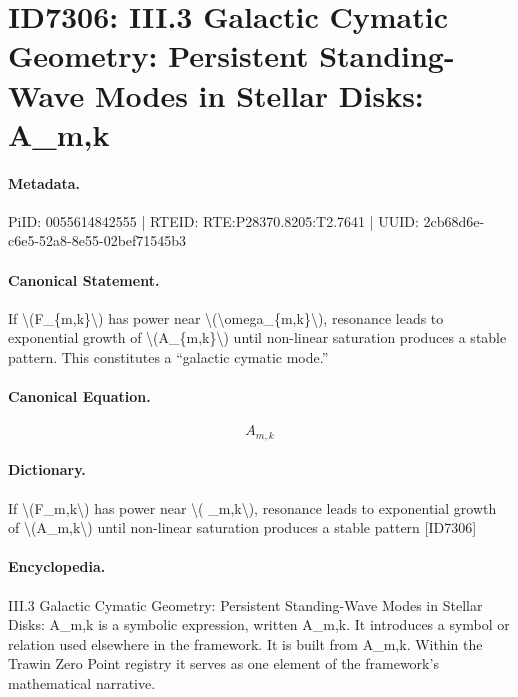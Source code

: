 \section*{ID7306: III.3 Galactic Cymatic Geometry: Persistent Standing-Wave Modes in Stellar Disks: A\_m,k}
\paragraph{Metadata.}
PiID: 0055614842555 | RTEID: RTE:P28370.8205:T2.7641 | UUID: 2cb68d6e-c6e5-52a8-8e55-02bef71545b3

\paragraph{Canonical Statement.}
If \textbackslash{}(F\_\{m,k\}\textbackslash{}) has power near \textbackslash{}(\textbackslash{}omega\_\{m,k\}\textbackslash{}), resonance leads to exponential growth of \textbackslash{}(A\_\{m,k\}\textbackslash{}) until non-linear saturation produces a stable pattern. This constitutes a “galactic cymatic mode.”

\paragraph{Canonical Equation.}
\[
A_{m,k}
\]

\paragraph{Dictionary.}
If \textbackslash{}(F\_m,k\textbackslash{}) has power near \textbackslash{}( \_m,k\textbackslash{}), resonance leads to exponential growth of \textbackslash{}(A\_m,k\textbackslash{}) until non-linear saturation produces a stable pattern [ID7306]

\paragraph{Encyclopedia.}
III.3 Galactic Cymatic Geometry: Persistent Standing-Wave Modes in Stellar Disks: A\_m,k is a symbolic expression, written A\_m,k. It introduces a symbol or relation used elsewhere in the framework. It is built from A\_m,k. Within the Trawin Zero Point registry it serves as one element of the framework's mathematical narrative.
